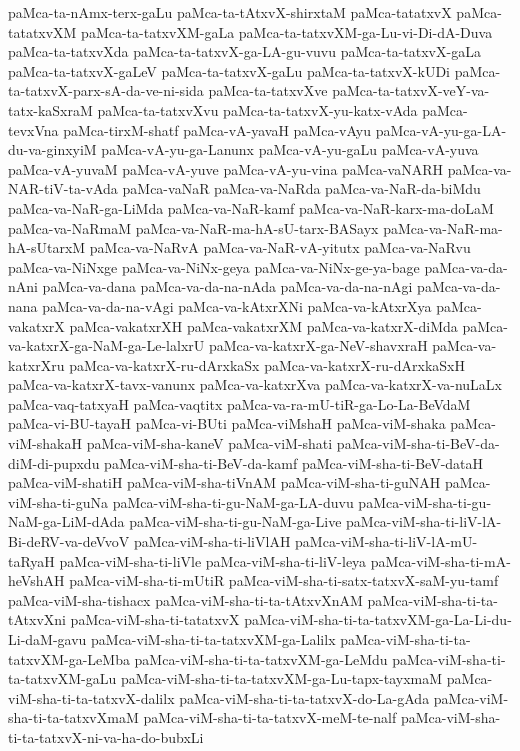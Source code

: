 {paMca-ta-nAmx-terx-gaLu
paMca-ta-tAtxvX-shirxtaM
paMca-tatatxvX
paMca-tatatxvXM
paMca-ta-tatxvXM-gaLa
paMca-ta-tatxvXM-ga-Lu-vi-Di-dA-Duva
paMca-ta-tatxvXda
paMca-ta-tatxvX-ga-LA-gu-vuvu
paMca-ta-tatxvX-gaLa
paMca-ta-tatxvX-gaLeV
paMca-ta-tatxvX-gaLu
paMca-ta-tatxvX-kUDi
paMca-ta-tatxvX-parx-sA-da-ve-ni-sida
paMca-ta-tatxvXve
paMca-ta-tatxvX-veY-va-tatx-kaSxraM
paMca-ta-tatxvXvu
paMca-ta-tatxvX-yu-katx-vAda
paMca-tevxVna
paMca-tirxM-shatf
paMca-vA-yavaH
paMca-vAyu
paMca-vA-yu-ga-LA-du-va-ginxyiM
paMca-vA-yu-ga-Lanunx
paMca-vA-yu-gaLu
paMca-vA-yuva
paMca-vA-yuvaM
paMca-vA-yuve
paMca-vA-yu-vina
paMca-vaNARH
paMca-va-NAR-tiV-ta-vAda
paMca-vaNaR
paMca-va-NaRda
paMca-va-NaR-da-biMdu
paMca-va-NaR-ga-LiMda
paMca-va-NaR-kamf
paMca-va-NaR-karx-ma-doLaM
paMca-va-NaRmaM
paMca-va-NaR-ma-hA-sU-tarx-BASayx
paMca-va-NaR-ma-hA-sUtarxM
paMca-va-NaRvA
paMca-va-NaR-vA-yitutx
paMca-va-NaRvu
paMca-va-NiNxge
paMca-va-NiNx-geya
paMca-va-NiNx-ge-ya-bage
paMca-va-da-nAni
paMca-va-dana
paMca-va-da-na-nAda
paMca-va-da-na-nAgi
paMca-va-da-nana
paMca-va-da-na-vAgi
paMca-va-kAtxrXNi
paMca-va-kAtxrXya
paMca-vakatxrX
paMca-vakatxrXH
paMca-vakatxrXM
paMca-va-katxrX-diMda
paMca-va-katxrX-ga-NaM-ga-Le-lalxrU
paMca-va-katxrX-ga-NeV-shavxraH
paMca-va-katxrXru
paMca-va-katxrX-ru-dArxkaSx
paMca-va-katxrX-ru-dArxkaSxH
paMca-va-katxrX-tavx-vanunx
paMca-va-katxrXva
paMca-va-katxrX-va-nuLaLx
paMca-vaq-tatxyaH
paMca-vaqtitx
paMca-va-ra-mU-tiR-ga-Lo-La-BeVdaM
paMca-vi-BU-tayaH
paMca-vi-BUti
paMca-viMshaH
paMca-viM-shaka
paMca-viM-shakaH
paMca-viM-sha-kaneV
paMca-viM-shati
paMca-viM-sha-ti-BeV-da-diM-di-pupxdu
paMca-viM-sha-ti-BeV-da-kamf
paMca-viM-sha-ti-BeV-dataH
paMca-viM-shatiH
paMca-viM-sha-tiVnAM
paMca-viM-sha-ti-guNAH
paMca-viM-sha-ti-guNa
paMca-viM-sha-ti-gu-NaM-ga-LA-duvu
paMca-viM-sha-ti-gu-NaM-ga-LiM-dAda
paMca-viM-sha-ti-gu-NaM-ga-Live
paMca-viM-sha-ti-liV-lA-Bi-deRV-va-deVvoV
paMca-viM-sha-ti-liVlAH
paMca-viM-sha-ti-liV-lA-mU-taRyaH
paMca-viM-sha-ti-liVle
paMca-viM-sha-ti-liV-leya
paMca-viM-sha-ti-mA-heVshAH
paMca-viM-sha-ti-mUtiR
paMca-viM-sha-ti-satx-tatxvX-saM-yu-tamf
paMca-viM-sha-tishacx
paMca-viM-sha-ti-ta-tAtxvXnAM
paMca-viM-sha-ti-ta-tAtxvXni
paMca-viM-sha-ti-tatatxvX
paMca-viM-sha-ti-ta-tatxvXM-ga-La-Li-du-Li-daM-gavu
paMca-viM-sha-ti-ta-tatxvXM-ga-Lalilx
paMca-viM-sha-ti-ta-tatxvXM-ga-LeMba
paMca-viM-sha-ti-ta-tatxvXM-ga-LeMdu
paMca-viM-sha-ti-ta-tatxvXM-gaLu
paMca-viM-sha-ti-ta-tatxvXM-ga-Lu-tapx-tayxmaM
paMca-viM-sha-ti-ta-tatxvX-dalilx
paMca-viM-sha-ti-ta-tatxvX-do-La-gAda
paMca-viM-sha-ti-ta-tatxvXmaM
paMca-viM-sha-ti-ta-tatxvX-meM-te-nalf
paMca-viM-sha-ti-ta-tatxvX-ni-va-ha-do-bubxLi
}
